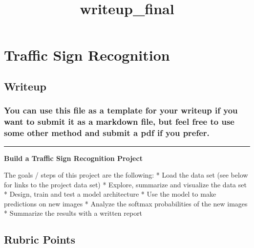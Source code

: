 \documentclass[11pt]{article}
\title{writeup\_final}
\begin{document}
    
    
    \maketitle
    
    

    
    \hypertarget{traffic-sign-recognition}{%
\section{\texorpdfstring{\textbf{Traffic Sign
Recognition}}{Traffic Sign Recognition}}\label{traffic-sign-recognition}}

\hypertarget{writeup}{%
\subsection{Writeup}\label{writeup}}

\hypertarget{you-can-use-this-file-as-a-template-for-your-writeup-if-you-want-to-submit-it-as-a-markdown-file-but-feel-free-to-use-some-other-method-and-submit-a-pdf-if-you-prefer.}{%
\subsubsection{You can use this file as a template for your writeup if
you want to submit it as a markdown file, but feel free to use some
other method and submit a pdf if you
prefer.}\label{you-can-use-this-file-as-a-template-for-your-writeup-if-you-want-to-submit-it-as-a-markdown-file-but-feel-free-to-use-some-other-method-and-submit-a-pdf-if-you-prefer.}}

\begin{center}\rule{0.5\linewidth}{\linethickness}\end{center}

\textbf{Build a Traffic Sign Recognition Project}

The goals / steps of this project are the following: * Load the data set
(see below for links to the project data set) * Explore, summarize and
visualize the data set * Design, train and test a model architecture *
Use the model to make predictions on new images * Analyze the softmax
probabilities of the new images * Summarize the results with a written
report

\hypertarget{rubric-points}{%
\subsection{Rubric Points}\label{rubric-points}}
\end{document}
